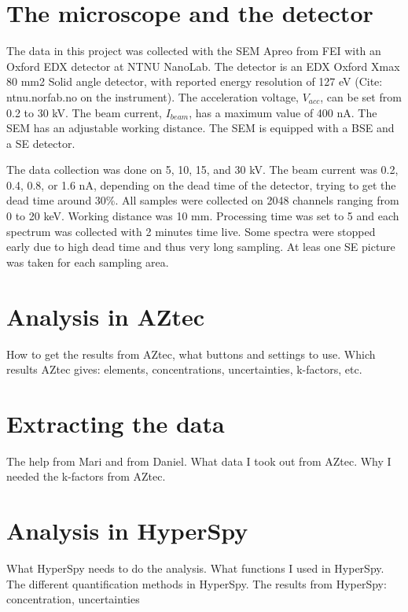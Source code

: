 %
%
\section{The microscope and the detector}
\label{sec:method:detector}
The data in this project was collected with the SEM Apreo from FEI with an Oxford EDX detector at NTNU NanoLab.
The detector is an EDX Oxford Xmax 80 mm2 Solid angle detector, with reported energy resolution of 127 eV (Cite: ntnu.norfab.no on the instrument).
The acceleration voltage, $V_{acc}$, can be set from 0.2 to 30 kV.
The beam current, $I_{beam}$, has a maximum value of 400 nA.
The SEM has an adjustable working distance.
The SEM is equipped with a BSE and a SE detector.

The data collection was done on 5, 10, 15, and 30 kV.
The beam current was 0.2, 0.4, 0.8, or 1.6 nA, depending on the dead time of the detector, trying to get the dead time around 30\%.
All samples were collected on 2048 channels ranging from 0 to 20 keV.
Working distance was 10 mm.
Processing time was set to 5 and each spectrum was collected with 2 minutes time live.
Some spectra were stopped early due to high dead time and thus very long sampling.
At leas one SE picture was taken for each sampling area.



%
%
\section{Analysis in AZtec}
\label{sec:method:aztec}
How to get the results from AZtec, what buttons and settings to use.
Which results AZtec gives: elements, concentrations, uncertainties, k-factors, etc.

%
%
\section{Extracting the data}
\label{sec:method:extracting}
The help from Mari and from Daniel.
What data I took out from AZtec.
Why I needed the k-factors from AZtec.


%
%
\section{Analysis in HyperSpy}
\label{sec:method:hspy}
What HyperSpy needs to do the analysis.
What functions I used in HyperSpy.
The different quantification methods in HyperSpy.
The results from HyperSpy: concentration, uncertainties

